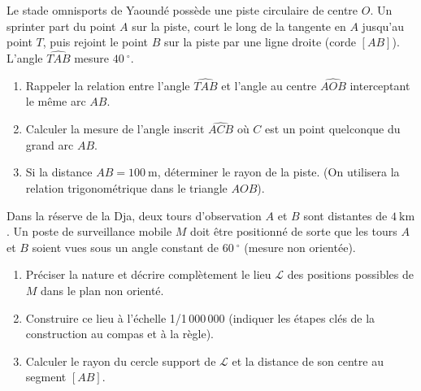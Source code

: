\documentclass[11pt]{article}
\providecommand{\degree}{^{\circ}}
\begin{document}
\begin{exercice}
Le stade omnisports de Yaoundé possède une piste circulaire de centre $O$. Un sprinter part du point $A$ sur la piste, court le long de la tangente en $A$ jusqu'au point $T$, puis rejoint le point $B$ sur la piste par une ligne droite (corde $[AB]$). L'angle $\widehat{TAB}$ mesure $\SI{40}{\degree}$.
\begin{enumerate}
    \item Rappeler la relation entre l'angle $\widehat{TAB}$ et l'angle au centre $\widehat{AOB}$ interceptant le même arc $AB$.
    \item Calculer la mesure de l'angle inscrit $\widehat{ACB}$ où $C$ est un point quelconque du grand arc $AB$.
    \item Si la distance $AB = \SI{100}{\meter}$, déterminer le rayon de la piste. (On utilisera la relation trigonométrique dans le triangle $AOB$).
\end{enumerate}
\end{exercice}

\begin{exercice}
Dans la réserve de la Dja, deux tours d'observation $A$ et $B$ sont distantes de $\SI{4}{\kilo\meter}$. Un poste de surveillance mobile $M$ doit être positionné de sorte que les tours $A$ et $B$ soient vues sous un angle constant de $\SI{60}{\degree}$ (mesure non orientée).
\begin{enumerate}
    \item Préciser la nature et décrire complètement le lieu $\mathcal{L}$ des positions possibles de $M$ dans le plan non orienté.
    \item Construire ce lieu à l'échelle 1/1\,000\,000 (indiquer les étapes clés de la construction au compas et à la règle).
    \item Calculer le rayon du cercle support de $\mathcal{L}$ et la distance de son centre au segment $[AB]$.
\end{enumerate}
\end{exercice}
\end{document}
